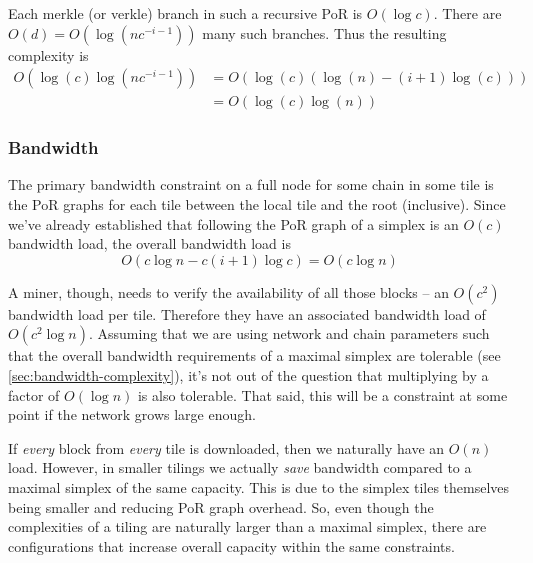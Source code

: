\newcommand\Psz{\ensuremath{\mathbb{P}}\xspace}

Each merkle (or verkle) branch in such a recursive PoR is $O(\log c)$.
There are $O(d) = O(\log(n c^{-i-1}))$ many such branches.
Thus the resulting complexity is
\begin{align*}
    O(\log(c) \log(n c^{-i-1})) & = O(\log(c)(\log(n) - (i+1)\log(c))) \\
    & = O(\log(c) \log(n))
\end{align*}




\subsubsection{Bandwidth}

\label{sec:tiling-bandwidth}

The primary bandwidth constraint on a full node for some chain in some tile is the PoR graphs for each tile between the local tile and the root (inclusive).
Since we've already established that following the PoR graph of a simplex is an $O(c)$ bandwidth load, the overall bandwidth load is
\begin{equation*}
    O(c \log n - c(i+1)\log c) = O(c \log n)
\end{equation*}

A miner, though, needs to verify the availability of all those blocks -- an $O(c^2)$ bandwidth load per tile.
Therefore they have an associated bandwidth load of $O(c^2 \log n)$.
Assuming that we are using network and chain parameters such that the overall bandwidth requirements of a maximal simplex are tolerable (see \autoref{sec:bandwidth-complexity}), it's not out of the question that multiplying by a factor of $O(\log n)$ is also tolerable.
That said, this will be a constraint at some point if the network grows large enough.

If \emph{every} block from \emph{every} tile is downloaded, then we naturally have an $O(n)$ load.
However, in smaller tilings we actually \emph{save} bandwidth compared to a maximal simplex of the same capacity.
This is due to the simplex tiles themselves being smaller and reducing PoR graph overhead.
So, even though the complexities of a tiling are naturally larger than a maximal simplex, there are configurations that increase overall capacity within the same constraints.

